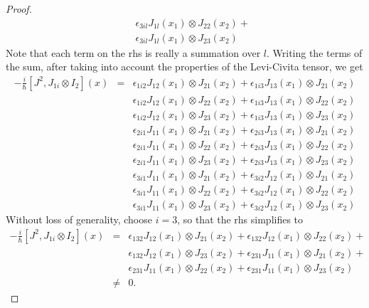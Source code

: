 \documentclass{article}
\numberwithin{equation}{section}
\theoremstyle{plain}
\numberwithin{thm}{section}
\theoremstyle{plain}
\numberwithin{prop}{section}
\theoremstyle{definition}
\numberwithin{defn}{section}
\theoremstyle{remark}
\begin{document}
\begin{proof}
\begin{eqnarray*}
& & \epsilon_{3il}J_{1l}(x_1) \otimes J_{22}(x_2) + \\
& & \epsilon_{3il}J_{1l}(x_1) \otimes J_{23}(x_2) 
\end{eqnarray*}
Note that each term on the rhs is really a summation over $l$. Writing the
terms of the sum, after taking into account the properties of the Levi-Civita
tensor, we get
\begin{eqnarray*}
-\frac{i}{\hslash}[J^2, J_{1i} \otimes I_2](x) &=&  
    \epsilon_{1i2}J_{12}(x_1) \otimes J_{21}(x_2) + 
    \epsilon_{1i3}J_{13}(x_1) \otimes J_{21}(x_2)\\
& & \epsilon_{1i2}J_{12}(x_1) \otimes J_{22}(x_2) + 
    \epsilon_{1i3}J_{13}(x_1) \otimes J_{22}(x_2)\\
& & \epsilon_{1i2}J_{12}(x_1) \otimes J_{23}(x_2) + 
    \epsilon_{1i3}J_{13}(x_1) \otimes J_{23}(x_2)\\
& & \epsilon_{2i1}J_{11}(x_1) \otimes J_{21}(x_2) + 
    \epsilon_{2i3}J_{13}(x_1) \otimes J_{21}(x_2) \\
& & \epsilon_{2i1}J_{11}(x_1) \otimes J_{22}(x_2) + 
    \epsilon_{2i3}J_{13}(x_1) \otimes J_{22}(x_2) \\
& & \epsilon_{2i1}J_{11}(x_1) \otimes J_{23}(x_2) + 
    \epsilon_{2i3}J_{13}(x_1) \otimes J_{23}(x_2)\\
& & \epsilon_{3i1}J_{11}(x_1) \otimes J_{21}(x_2) + 
    \epsilon_{3i2}J_{12}(x_1) \otimes J_{21}(x_2)\\
& & \epsilon_{3i1}J_{11}(x_1) \otimes J_{22}(x_2) + 
    \epsilon_{3i2}J_{12}(x_1) \otimes J_{22}(x_2)\\
& & \epsilon_{3i1}J_{11}(x_1) \otimes J_{23}(x_2) + 
    \epsilon_{3i2}J_{12}(x_1) \otimes J_{23}(x_2)
\end{eqnarray*}
Without loss of generality, choose $i=3$, so that the rhs simplifies to
\begin{eqnarray*}
-\frac{i}{\hslash}[J^2, J_{1i} \otimes I_2](x) &=&  
    \epsilon_{132}J_{12}(x_1) \otimes J_{21}(x_2) + 
 \epsilon_{132}J_{12}(x_1) \otimes J_{22}(x_2) + \\
& & \epsilon_{132}J_{12}(x_1) \otimes J_{23}(x_2) + 
 \epsilon_{231}J_{11}(x_1) \otimes J_{21}(x_2) + \\
& & \epsilon_{231}J_{11}(x_1) \otimes J_{22}(x_2) + 
 \epsilon_{231}J_{11}(x_1) \otimes J_{23}(x_2) \\
&\ne& 0.
\end{eqnarray*}
\end{proof}
\end{document}
